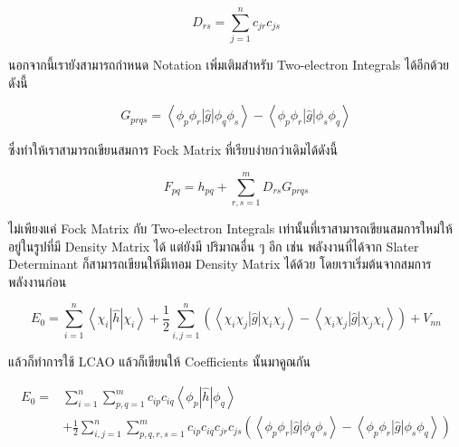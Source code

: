 \begin{equation}
    \label{eq:Density Matrix}
    D_{r s} = \sum_{j=1}^n c_{j r} c_{j s}
\end{equation}

นอกจากนี้เรายังสามารถกำหนด Notation เพิ่มเติมสำหรับ Two-electron Integrals ได้อีกด้วย ดังนี้

\begin{equation}
    \label{eq:two_electron_integral}
    G_{p r q s}
    =
    \left\langle\phi_p \phi_r|\hat{g}| \phi_q \phi_s\right\rangle
    - \left\langle\phi_p \phi_r|\hat{g}| \phi_s \phi_q\right\rangle
\end{equation}

\noindent ซึ่งทำให้เราสามารถเขียนสมการ Fock Matrix ที่เรียบง่ายกว่าเดิมได้ดังนี้

\begin{equation}
    \label{eq:Fock_Matrix}
    F_{p q}
    =
    h_{p q}+\sum_{r, s=1}^m D_{r s} G_{p r q s}
\end{equation}

ไม่เพียงแค่ Fock Matrix กับ Two-electron Integrals เท่านั้นที่เราสามารถเขียนสมการใหม่ให้อยู่ในรูปที่มี Density Matrix ได้ แต่ยังมี%
ปริมาณอื่น ๆ อีก เช่น พลังงานที่ได้จาก Slater Determinant ก็สามารถเขียนให้มีเทอม Density Matrix ได้ด้วย โดยเราเริ่มต้นจากสมการ%
พลังงานก่อน

\begin{equation}
    E_0
    =
    \sum_{i=1}^n \left\langle\chi_i|\hat{h}| \chi_i\right\rangle
    + \frac{1}{2}
    \sum_{i, j=1}^n \left(\left\langle\chi_i \chi_j|\hat{g}| \chi_i \chi_j\right\rangle \right.
    - \left. \left\langle\chi_i \chi_j|\hat{g}| \chi_j \chi_i\right\rangle\right)+V_{n n}
\end{equation}

\noindent แล้วก็ทำการใช้ LCAO แล้วก็เขียนให้ Coefficients นั้นมาคูณกัน

\begin{equation}
    \begin{aligned}
        E_0
        =
         & \sum_{i=1}^n \sum_{p, q=1}^m c_{i p} c_{i q}\left\langle\phi_p|\hat{h}| \phi_q\right\rangle \\
         & + \frac{1}{2}
        \sum_{i, j=1}^n
        \sum_{p, q, r, s=1}^m
        c_{i p} c_{i q} c_{j r} c_{j s}
        \left(
        \left\langle\phi_p \phi_r|\hat{g}| \phi_q \phi_s\right\rangle
        - \left\langle\phi_p \phi_r|\hat{g}| \phi_s \phi_q\right\rangle
        \right)
    \end{aligned}
\end{equation}


